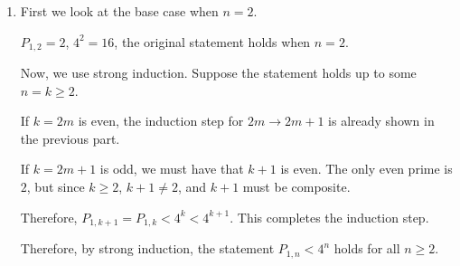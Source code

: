 \begin{enumerate}
    \item First we look at the base case when \(n = 2\).

          \(P_{1, 2} = 2\), \(4^2 = 16\), the original statement holds when \(n = 2\).

          Now, we use strong induction. Suppose the statement holds up to some \(n = k \geq 2\).

          If \(k = 2m\) is even, the induction step for \(2m \to 2m + 1\) is already shown in the previous part.

          If \(k = 2m + 1\) is odd, we must have that \(k + 1\) is even. The only even prime is \(2\), but since \(k \geq 2\), \(k + 1 \neq 2\), and \(k + 1\) must be composite.

          Therefore, \(P_{1, k + 1} = P_{1, k} < 4^{k} < 4^{k + 1}\). This completes the induction step.

          Therefore, by strong induction, the statement \(P_{1, n} < 4^n\) holds for all \(n \geq 2\).
\end{enumerate}